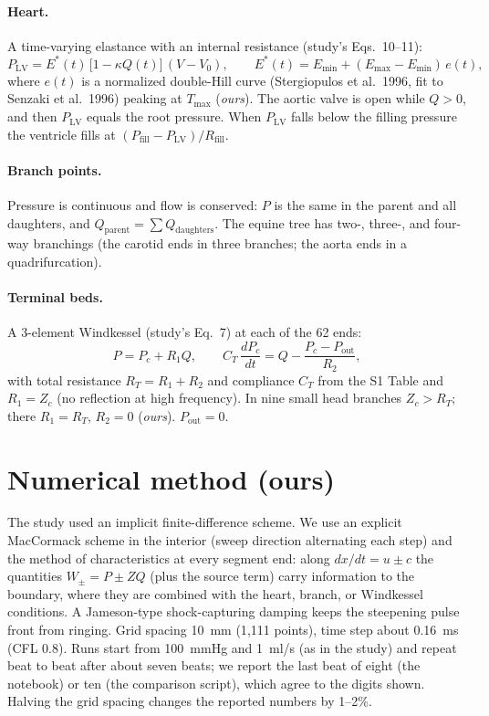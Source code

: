 \documentclass[10pt]{article}
\begin{document}
\paragraph{Heart.} A time-varying elastance with an internal resistance (study's Eqs.~10--11):
\begin{equation}
P_{\mathrm{LV}} = E^*(t)\,\big[1-\kappa Q(t)\big]\,(V-V_0),\qquad
E^*(t) = E_{\min} + (E_{\max}-E_{\min})\,e(t),
\end{equation}
where $e(t)$ is a normalized double-Hill curve (Stergiopulos et al.\ 1996, fit to Senzaki et al.\ 1996) peaking at
$T_{\max}$ (\emph{ours}). The aortic valve is open while $Q>0$, and then $P_{\mathrm{LV}}$ equals the root pressure. When
$P_{\mathrm{LV}}$ falls below the filling pressure the ventricle fills at $(P_{\mathrm{fill}}-P_{\mathrm{LV}})/R_{\mathrm{fill}}$.

\paragraph{Branch points.} Pressure is continuous and flow is conserved: $P$ is the same in the parent and all
daughters, and $Q_{\mathrm{parent}}=\sum Q_{\mathrm{daughters}}$. The equine tree has two-, three-, and four-way branchings
(the carotid ends in three branches; the aorta ends in a quadrifurcation).

\paragraph{Terminal beds.} A 3-element Windkessel (study's Eq.~7) at each of the 62 ends:
\begin{equation}
P = P_c + R_1 Q,\qquad C_T\,\frac{dP_c}{dt} = Q - \frac{P_c-P_{\mathrm{out}}}{R_2},
\end{equation}
with total resistance $R_T=R_1+R_2$ and compliance $C_T$ from the S1 Table and $R_1=Z_c$ (no reflection at high
frequency). In nine small head branches $Z_c>R_T$; there $R_1=R_T$, $R_2=0$ (\emph{ours}). $P_{\mathrm{out}}=0$.

\section{Numerical method (ours)}
The study used an implicit finite-difference scheme. We use an explicit MacCormack scheme in the interior (sweep
direction alternating each step) and the method of characteristics at every segment end: along $dx/dt=u\pm c$ the
quantities $W_\pm = P\pm ZQ$ (plus the source term) carry information to the boundary, where they are combined with
the heart, branch, or Windkessel conditions. A Jameson-type shock-capturing damping keeps the steepening pulse front
from ringing. Grid spacing 10~mm (1{,}111 points), time step about 0.16~ms (CFL 0.8). Runs start from 100~mmHg and
1~ml/s (as in the study) and repeat beat to beat after about seven beats; we report the last beat of eight (the
notebook) or ten (the comparison script), which agree to the digits shown. Halving the grid spacing changes the
reported numbers by 1--2\%.
\end{document}
